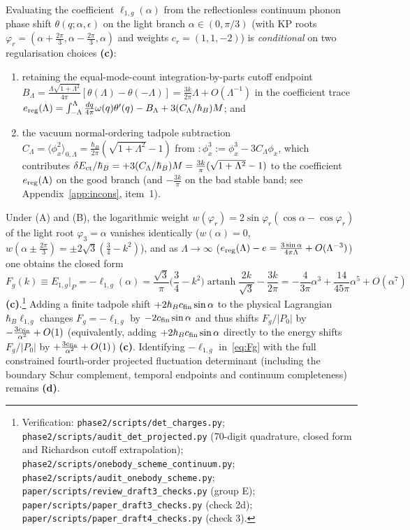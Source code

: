 \documentclass[11pt,a4paper]{article}
\newcommand{\lab}[1]{{\normalfont\sffamily\footnotesize\bfseries(#1)}}
\newcommand{\Lc}{\lab{c}}
\newcommand{\Ld}{\lab{d}}
\newcommand{\scr}[1]{\nolinkurl{#1}}
\newcommand{\chk}[1]{\footnote{\raggedright Verification: #1.}}
\newcommand{\hb}{\hbar}
\theoremstyle{remark}
\begin{document}
Evaluating the coefficient $\ell_{1,g}(\alpha)$ from the reflectionless continuum phonon phase shift $\theta(q;\alpha,\epsilon)$ on the light branch $\alpha\in(0,\pi/3)$ (with KP roots $\varphi_r=(\alpha+\tfrac{2\pi}3,\alpha-\tfrac{2\pi}3,\alpha)$ and weights $c_r=(1,1,-2)$) is \emph{conditional} on two regularisation choices \Lc:
\begin{enumerate}
\item[(A)] retaining the equal-mode-count integration-by-parts cutoff endpoint $B_\Lambda=\frac{\Lambda\sqrt{1+\Lambda^2}}{4\pi}[\theta(\Lambda)-\theta(-\Lambda)]=\frac{3k}{2\pi}\Lambda+O(\Lambda^{-1})$ in the coefficient trace $e_{\rm reg}(\Lambda)=\int_{-\Lambda}^\Lambda\frac{dq}{4\pi}\omega(q)\theta'(q)-B_\Lambda+3(C_\Lambda/\hb_B)M$; and
\item[(B)] the vacuum normal-ordering tadpole subtraction $C_\Lambda=\langle\phi_x^2\rangle_{0,\Lambda}=\frac{\hb_B}{2\pi}(\sqrt{1+\Lambda^2}-1)$ from $:\!\phi_x^3\!:=\phi_x^3-3C_\Lambda\phi_x$, which contributes $\delta E_{\rm ct}/\hb_B=+3(C_\Lambda/\hb_B)M=\frac{3k}{\pi}(\sqrt{1+\Lambda^2}-1)$ to the coefficient $e_{\rm reg}(\Lambda)$ on the good branch (and $-\frac{3k}{\pi}$ on the bad stable band; see Appendix~\ref{app:incons}, item~1).
\end{enumerate}
Under (A) and (B), the logarithmic weight $w(\varphi_r)=2\sin\varphi_r(\cos\alpha-\cos\varphi_r)$ of the light root $\varphi_3=\alpha$ vanishes identically ($w(\alpha)=0$, $w(\alpha\pm\tfrac{2\pi}3)=\pm2\sqrt3(\tfrac34-k^2)$), and as $\Lambda\to\infty$ ($e_{\rm reg}(\Lambda)-e=\frac{3\sin\alpha}{4\pi\Lambda}+O(\Lambda^{-3})$) one obtains the closed form
\begin{equation}\label{eq:Fg}
F_g(k)\equiv E_{1,g}|_P=-\ell_{1,g}(\alpha)
=\frac{\sqrt3}{\pi}\Big(\frac34-k^2\Big)\operatorname{artanh}\frac{2k}{\sqrt3}-\frac{3k}{2\pi}
=-\frac4{3\pi}\alpha^3+\frac{14}{45\pi}\alpha^5+O(\alpha^7)
\end{equation}
\Lc.\chk{\scr{phase2/scripts/det_charges.py}; \scr{phase2/scripts/audit_det_projected.py} (70-digit quadrature, closed form and Richardson cutoff extrapolation); \scr{phase2/scripts/onebody_scheme_continuum.py}; \scr{phase2/scripts/audit_onebody_scheme.py}; \scr{paper/scripts/review_draft3_checks.py} (group E); \scr{paper/scripts/paper_draft3_checks.py} (check 2d); \scr{paper/scripts/paper_draft4_checks.py} (check 3)}
Adding a finite tadpole shift $+2\hb_B c_{\rm fin}\sin\alpha$ to the physical Lagrangian $\hb_B\ell_{1,g}$ changes $F_g=-\ell_{1,g}$ by $-2c_{\rm fin}\sin\alpha$ and thus shifts $F_g/|P_0|$ by $-\frac{3c_{\rm fin}}{\alpha^2}+O(1)$ (equivalently, adding $+2\hb_B c_{\rm fin}\sin\alpha$ directly to the energy shifts $F_g/|P_0|$ by $+\frac{3c_{\rm fin}}{\alpha^2}+O(1)$) \Lc. Identifying $-\ell_{1,g}$ in~\eqref{eq:Fg} with the full constrained fourth-order projected fluctuation determinant (including the boundary Schur complement, temporal endpoints and continuum completeness) remains \Ld.
\end{document}
